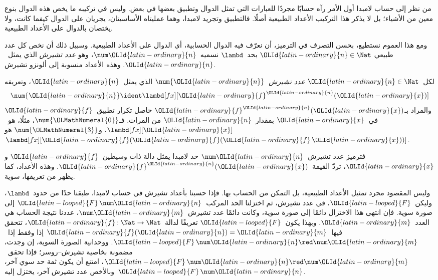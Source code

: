 \documentclass[../../../include/open-logic-section]{subfiles}
\begin{document}

من نظر إلى حساب لامبدا أول الأمر رآه حسابًا مجردًا للعبارات التي تمثل
الدوال وتطبيق بعضها في بعض. وليس في تركيبه ما يخص هذه الدوال بنوع
معين من الأشياء؛ بل لا يذكر هذا التركيب الأعداد الطبيعية أصلًا.
فالتطبيق وتجريد لامبدا، وهما عمليتاه الأساسيتان، يجريان على الدوال
كيفما كانت، ولا يختصان بالدوال على الأعداد الطبيعية.

ومع هذا العموم نستطيع، بحسن التصرف في الترميز، أن نعرّف فيه الدوال
الحسابية، أي الدوال على الأعداد الطبيعية. وسبيل ذلك أن نخص كل عدد طبيعي
$\OLId{latin-ordinary}{n} \in \Nat$ بحد~$\lambd$ نسميه~$\num \OLId{latin-ordinary}{n}$، وهو \emph{عدد تشيرش}
الذي يمثل~$\OLId{latin-ordinary}{n}$. وهذه الأعداد منسوبة إلى ألونزو تشيرش.

\begin{defn}
  لكل~$\OLId{latin-ordinary}{n} \in \Nat$ \emph{عدد تشيرش}~$\num{\OLId{latin-ordinary}{n}}$ الذي يمثل~$\OLId{latin-ordinary}{n}$،
  وتعريفه
  \[
    \num{\OLId{latin-ordinary}{n}} \ident \lambd[fx][\OLId{latin-ordinary}{f}^\OLId{latin-ordinary}{n}(\OLId{latin-ordinary}{x})]
  \]
  والمراد بـ$\OLId{latin-ordinary}{f}^\OLId{latin-ordinary}{n}(\OLId{latin-ordinary}{x})$ حاصل تكرار تطبيق~$\OLId{latin-ordinary}{f}$ في~$\OLId{latin-ordinary}{x}$ بمقدار~$\OLId{latin-ordinary}{n}$ من المرات.
  فـ$\num{\OLMathNumeral{0}}$، مثلًا، هو~$\lambd[fx][\OLId{latin-ordinary}{x}]$، و$\num{\OLMathNumeral{3}}$
  هو~$\lambd[fx][\OLId{latin-ordinary}{f}(\OLId{latin-ordinary}{f}(\OLId{latin-ordinary}{f}\,\OLId{latin-ordinary}{x}))]$.
\end{defn}
  
فترميز عدد تشيرش~$\num \OLId{latin-ordinary}{n}$ حد لامبدا يمثل دالة ذات وسيطين~$\OLId{latin-ordinary}{f}$ و$\OLId{latin-ordinary}{x}$،
تردّ القيمة~$\OLId{latin-ordinary}{f}^\OLId{latin-ordinary}{n}(\OLId{latin-ordinary}{x})$. وهذه الأعداد، كما يظهر من تعريفها، سوية.

وليس المقصود مجرد تمثيل الأعداد الطبيعية، بل التمكن من الحساب بها.
فإذا حسبنا بأعداد تشيرش في حساب لامبدا، طبقنا حدًا من حدود~$\lambd$،
وليكن~$\OLId{latin-looped}{F}$، في عدد تشيرش، ثم اختزلنا الحد المركب~$\OLId{latin-looped}{F}\, \num \OLId{latin-ordinary}{n}$ إلى صورة سوية.
فإن انتهى هذا الاختزال دائمًا إلى صورة سوية، وكانت دائمًا عدد تشيرش~$\num \OLId{latin-ordinary}{m}$،
عددنا نتيجة الحساب هي العدد~$\OLId{latin-ordinary}{m}$.
وبهذا يكون~$\OLId{latin-looped}{F}$ تعريفًا لدالة~$\OLId{latin-ordinary}{f}\colon \Nat \to \Nat$،
تتحقق فيها~$\OLId{latin-ordinary}{f}(\OLId{latin-ordinary}{n}) = \OLId{latin-ordinary}{m}$ إذا وفقط إذا~$\OLId{latin-looped}{F}\, \num \OLId{latin-ordinary}{n} \red \num \OLId{latin-ordinary}{m}$.
ووحدانية الصورة السوية، إن وجدت، مضمونة بخاصية تشيرش--روسر؛
فإذا تحقق~$\OLId{latin-looped}{F}\, \num \OLId{latin-ordinary}{n} \red \num \OLId{latin-ordinary}{m}$، امتنع أن يكون ثمة حد سوي آخر،
وبالأخص عدد تشيرش آخر، يختزل إليه~$\OLId{latin-looped}{F} \, \num \OLId{latin-ordinary}{n}$.
\end{document}
